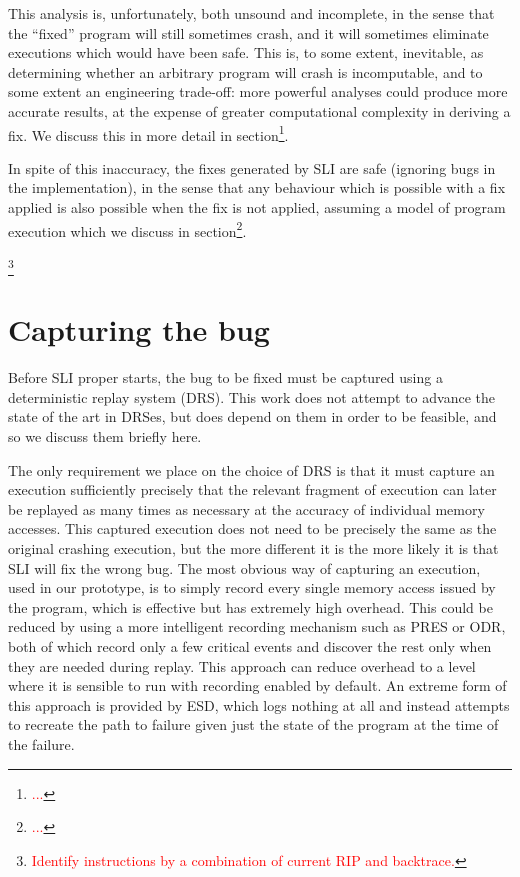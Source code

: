 \documentclass[10pt,twocolumn,preprint,natbib,authoryear]{sigplanconf}
\newcommand{\editorial}[1]{\textcolor{red}{\footnote{\textcolor{red}{#1}}}}
\begin{document}
This analysis is, unfortunately, both unsound and incomplete, in the
sense that the ``fixed'' program will still sometimes crash, and it
will sometimes eliminate executions which would have been safe.  This
is, to some extent, inevitable, as determining whether an arbitrary
program will crash is incomputable, and to some extent an engineering
trade-off: more powerful analyses could produce more accurate results,
at the expense of greater computational complexity in deriving a fix.
We discuss this in more detail in section\editorial{...}.

In spite of this inaccuracy, the fixes generated by SLI are safe
(ignoring bugs in the implementation), in the sense that any behaviour
which is possible with a fix applied is also possible when the fix is
not applied, assuming a model of program execution which we discuss in
section\editorial{...}.

\editorial{Identify instructions by a combination of current RIP and
  backtrace.}

\section{Capturing the bug}

Before SLI proper starts, the bug to be fixed must be captured using a
deterministic replay system (DRS).  This work does not attempt to
advance the state of the art in DRSes, but does depend on them in
order to be feasible, and so we discuss them briefly here.

The only requirement we place on the choice of DRS is that it must
capture an execution sufficiently precisely that the relevant fragment
of execution can later be replayed as many times as necessary at the
accuracy of individual memory accesses.  This captured execution does
not need to be precisely the same as the original crashing execution,
but the more different it is the more likely it is that SLI will fix
the wrong bug.  The most obvious way of capturing an execution, used
in our prototype, is to simply record every single memory access
issued by the program, which is effective but has extremely high
overhead.  This could be reduced by using a more intelligent recording
mechanism such as PRES\cite{Park2009} or ODR\cite{Altekar2009}, both
of which record only a few critical events and discover the rest only
when they are needed during replay.  This approach can reduce overhead
to a level where it is sensible to run with recording enabled by
default.  An extreme form of this approach is provided by
ESD\cite{Zamfir2010}, which logs nothing at all and instead attempts
to recreate the path to failure given just the state of the program at
the time of the failure.
\end{document}
